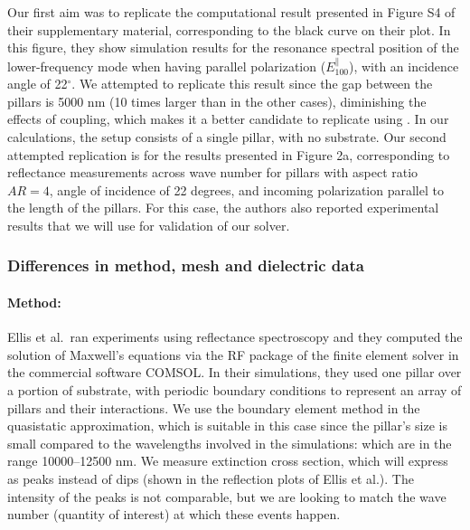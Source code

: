 Our first aim was to replicate the computational result presented in Figure S4 of their supplementary 
material, corresponding to the black curve on their plot. In this 
figure, they show simulation results for the resonance spectral position of the lower-frequency 
mode when having parallel polarization ($E^{\parallel}_{100}$), with an incidence angle of 22$^\circ$.
We attempted to replicate this result since the gap between the pillars 
is 5000 nm (10 times larger than in the other cases), diminishing the effects of coupling, which makes it 
a better candidate to replicate using \pygbe. 
In our calculations, the setup consists of a single pillar, with no substrate.
Our second attempted replication is  
for the results presented in Figure 2a, corresponding to reflectance measurements across wave number
for pillars with aspect ratio $AR=4$, angle of incidence of 22 degrees, and incoming polarization parallel to the 
length of the pillars. For this case, the authors also reported experimental results that we will use for validation of our solver. 

\subsubsection{Differences in method, mesh and dielectric data}

\paragraph{Method:}
Ellis et al.\ ran experiments using reflectance spectroscopy and they computed the solution of
Maxwell's equations via the RF package of the finite element solver in the commercial software COMSOL. 
In their simulations, 
they used one pillar over a portion of substrate, with periodic boundary conditions to represent an array of 
pillars and their interactions. 
We use the boundary element method in the quasistatic approximation, which is suitable in this case 
since the pillar's size is small compared to the wavelengths involved in the simulations: 
which are in the range 10000--12500 nm. 
We measure extinction cross section, which will express as peaks instead of dips (shown in the reflection plots of Ellis et al.). 
The intensity of the peaks is not comparable, but we are looking to match the wave number (quantity of interest) at which these events happen. 

